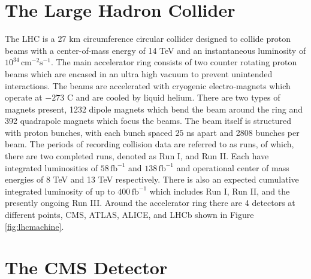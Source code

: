 \section{The Large Hadron Collider}
The LHC is a 27 km circumference circular collider designed to collide proton beams with a center-of-mass energy of 14 TeV and an instantaneous luminosity of $10^{34} \, \text{cm}^{-2}\text{s}^{-1}$\cite{Evans:2008zzb}. The main accelerator ring consists of two counter rotating proton beams which are encased in an ultra high vacuum to prevent unintended interactions. The beams are accelerated with cryogenic electro-magnets which operate at $-273$ \degree C and are cooled by liquid helium. There are two types of magnets present, 1232 dipole magnets which bend the beam around the ring and 392 quadrapole magnets which focus the beams.  The beam itself is structured with proton bunches, with each bunch spaced $25$ ns apart and 2808 bunches per beam. The periods of recording collision data are referred to as runs, of which, there are two completed runs, denoted as Run I, and Run II. Each have integrated luminosities of $58 \, \text{fb}^{-1}$ and $138\, \text{fb}^{-1}$ and operational center of mass energies of 8 TeV and 13 TeV respectively. There is also an expected cumulative integrated luminosity of up to $400 \,\text{fb}^{-1}$ which includes Run I, Run II, and the presently ongoing Run III. Around the accelerator ring there are 4 detectors at different points, CMS, ATLAS, ALICE, and LHCb shown in Figure \ref{fig:lhcmachine}.




\section{The CMS Detector}


